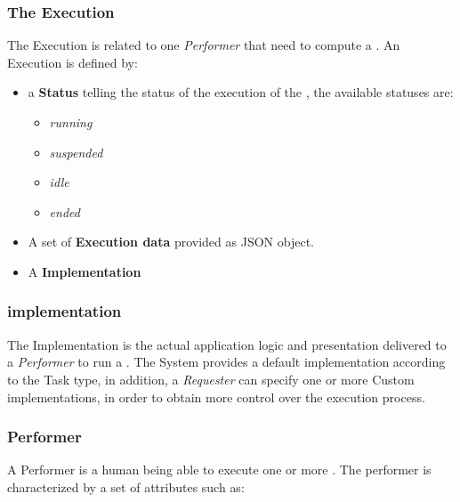 \subsubsection{The Execution}
The Execution is related to one \emph{Performer} that need to compute a \utask{}.
An Execution is defined by:
\begin{itemize}
    \item a \textbf{Status} telling the status of the execution of the \utask{},
    the available statuses are:
    \begin{itemize}
        \item \emph{running}
        \item \emph{suspended}
        \item \emph{idle}
        \item \emph{ended}
    \end{itemize}

    \item A set of \textbf{Execution data} provided as \ac{JSON} object.

    \item A \utask{} \textbf{Implementation}
\end{itemize}







\subsubsection{\utask{} implementation}
The \utask{} Implementation is the actual application logic and presentation
delivered to a \emph{Performer} to run a \utask{}. The System provides a default
implementation according to the Task type, in addition, a \emph{Requester} can
specify one or more Custom implementations, in order to obtain more control over
the execution process.








\subsubsection{Performer}
A Performer is a human being able to execute one or more \utask{}. The performer is characterized by a set of attributes such as:

